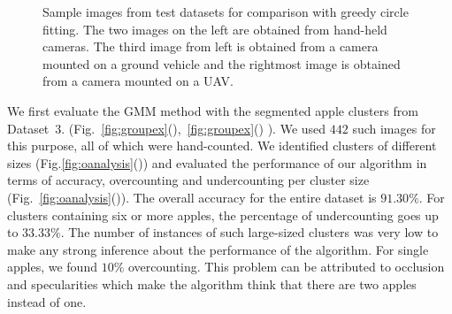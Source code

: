 \begin{figure}[!hbpt]
\begin{subfigure}[b]{.20\textwidth}
       \end{subfigure}
   \caption[Sample images from test datasets for comparison with greedy circle fitting.]{Sample images from test datasets for comparison with greedy circle fitting. The two images on the left are obtained from hand-held cameras. The third image from left is obtained from a camera mounted on a ground vehicle and the rightmost image is obtained from a camera mounted on a UAV.}
   \label{fig:datasets}
\end{figure}    



We first evaluate the GMM method with the segmented apple clusters from Dataset~3. (Fig.~\ref{fig:groupex}(),~\ref{fig:groupex}() ). We used $442$ such images for this purpose, all of which were hand-counted. We identified clusters of different sizes (Fig.\ref{fig:oanalysis}()) and evaluated the performance of our algorithm in terms of accuracy, overcounting and undercounting per cluster size (Fig.~\ref{fig:oanalysis}()). The overall accuracy for the entire dataset is $91.30\%$. For clusters containing six or more apples, the percentage of undercounting goes up to $33.33\%$. The number of instances of such large-sized clusters was very low to make any strong inference about the performance of the algorithm. For single apples, we found $10\%$ overcounting. This problem can be attributed to occlusion and specularities which make the algorithm think that there are two apples instead of one.

